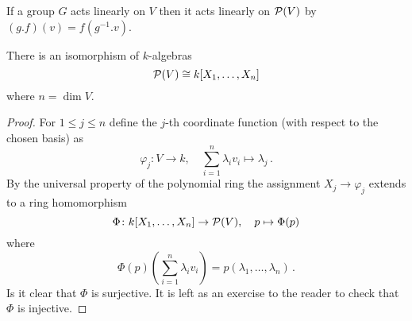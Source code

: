 \begin{remark}
  If a group $G$ acts linearly on $V$ then it acts linearly on $\mathcal{P}(V)$ by $(g.f)(v) = f\left(g^{-1}.v\right)$.
\end{remark}


\begin{lemma}
  There is an isomorphism of $k$-algebras
  \[
          \mathcal{P}(V)
    \cong k[X_1, \dotsc, X_n]
  \]
  where $n = \dim V$.
\end{lemma}
\begin{proof}
  For $1 \leq j \leq n$ define the $j$-th coordinate function (with respect to the chosen basis) as
  \[
            \varphi_j
    \colon  V \to k,
    \quad   \sum_{i=1}^n \lambda_i v_i
    \mapsto \lambda_j \,.
  \]
  By the universal property of the polynomial ring the assignment $X_j \to \varphi_j$ extends to a ring homomorphism
  \[
            \Phi
    \colon  k[X_1, \dotsc, X_n] \to \mathcal{P}(V),
    \quad   p
    \mapsto \Phi(p)
  \]
  where
  \[
      \Phi(p)\left( \sum_{i=1}^n \lambda_i v_i \right)
    = p(\lambda_1, \dotsc, \lambda_n) \,.
  \]
  Is it clear that $\Phi$ is surjective.
  It is left as an exercise to the reader to check that $\Phi$ is injective.
\end{proof}


